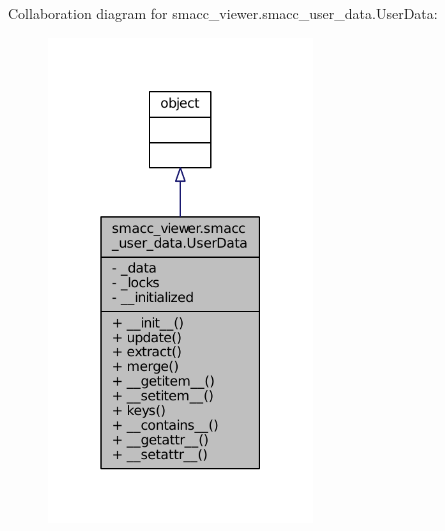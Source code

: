 Collaboration diagram for smacc\+\_\+viewer.\+smacc\+\_\+user\+\_\+data.\+User\+Data\+:
\nopagebreak
\begin{figure}[H]
\begin{center}
\leavevmode
\includegraphics[width=199pt]{classsmacc__viewer_1_1smacc__user__data_1_1UserData__coll__graph}
\end{center}
\end{figure}

